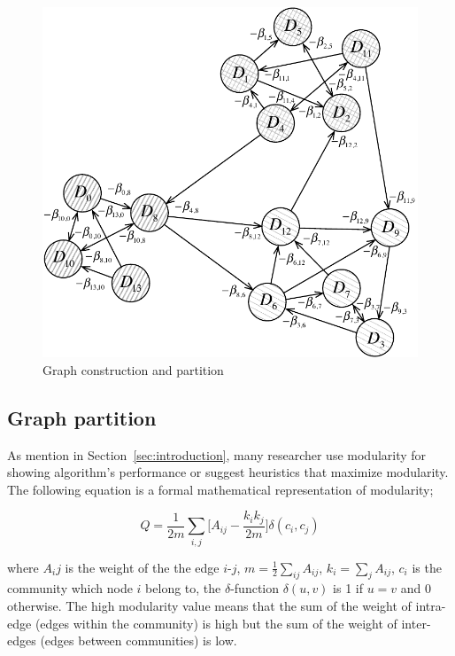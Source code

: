 \documentclass{article}
\begin{document}
\begin{figure} [h]
  \centering
  \includegraphics[width=.9\linewidth]{figs/graphConPartition}
  \caption{Graph construction and partition}
  \label{fig:graphConPartition}
\end{figure}


\subsection{Graph partition} \label{sec:graphPartition}

As mention in Section~\ref{sec:introduction}, many researcher use modularity for showing algorithm's performance or suggest heuristics that maximize modularity. The following equation is a formal mathematical representation of modularity;


\begin{equation} \label{eq:modularity}
    Q= \frac{1}{2m} \sum_{i,j} \Big[A_{ij} - \frac{k_{i}k_{j}}{2m}\Big] \delta(c_{i},c_{j})
\end{equation}

\noindent where $A_ij$ is the weight of the the edge $i$-$j$, $m=\frac{1}{2} \sum_{ij}A_{ij}$, $k_{i}=\sum_{j}A_{ij}$, $c_i$ is the community which node $i$ belong to, the $\delta$-function $\delta(u,v)$ is 1 if $u=v$ and 0 otherwise. The high modularity value means that the sum of the weight of intra-edge (edges within the community) is high but the sum of the weight of inter-edges (edges between communities) is low.
\end{document}
